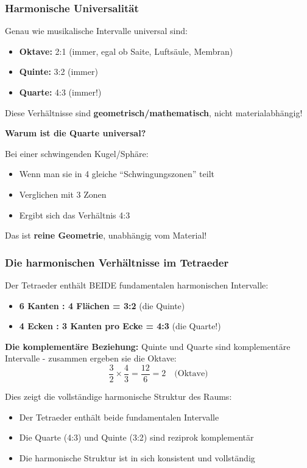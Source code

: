 	\subsubsection{Harmonische Universalität}
	\label{subsubsec:harmonische_universalitaet}
	
	Genau wie musikalische Intervalle universal sind:
	\begin{itemize}
		\item \textbf{Oktave:} 2:1 (immer, egal ob Saite, Luftsäule, Membran)
		\item \textbf{Quinte:} 3:2 (immer)
		\item \textbf{Quarte:} 4:3 (immer!)
	\end{itemize}
	
	Diese Verhältnisse sind \textbf{geometrisch/mathematisch}, nicht materialabhängig!
	
	\textbf{Warum ist die Quarte universal?}
	
	Bei einer schwingenden Kugel/Sphäre:
	\begin{itemize}
		\item Wenn man sie in 4 gleiche ``Schwingungszonen'' teilt
		\item Verglichen mit 3 Zonen
		\item Ergibt sich das Verhältnis 4:3
	\end{itemize}
	
	Das ist \textbf{reine Geometrie}, unabhängig vom Material!
	
	\subsubsection{Die harmonischen Verhältnisse im Tetraeder}
	\label{subsubsec:tetraeder_harmonik}
	
	Der Tetraeder enthält BEIDE fundamentalen harmonischen Intervalle:
	\begin{itemize}
		\item \textbf{6 Kanten : 4 Flächen = 3:2} (die Quinte)
		\item \textbf{4 Ecken : 3 Kanten pro Ecke = 4:3} (die Quarte!)
	\end{itemize}
	
	\textbf{Die komplementäre Beziehung:}
	Quinte und Quarte sind komplementäre Intervalle - zusammen ergeben sie die Oktave:
	\begin{equation}
		\frac{3}{2} \times \frac{4}{3} = \frac{12}{6} = 2 \quad \text{(Oktave)}
	\end{equation}
	
	Dies zeigt die vollständige harmonische Struktur des Raums:
	\begin{itemize}
		\item Der Tetraeder enthält beide fundamentalen Intervalle
		\item Die Quarte (4:3) und Quinte (3:2) sind reziprok komplementär
		\item Die harmonische Struktur ist in sich konsistent und vollständig
	\end{itemize}
	
